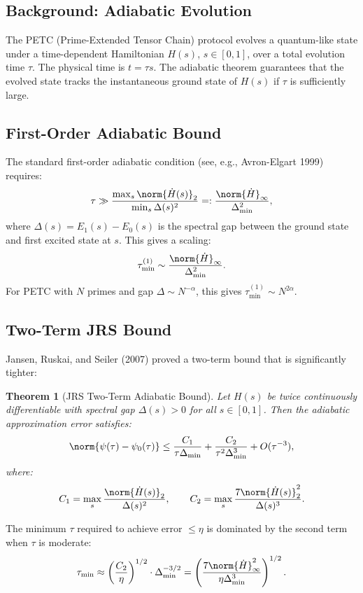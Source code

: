\documentclass[11pt,letterpaper]{article}
\newtheorem{theorem}{Theorem}[section]
\theoremstyle{remark}
\begin{document}
\subsection{Background: Adiabatic Evolution}

The PETC (Prime-Extended Tensor Chain) protocol evolves a quantum-like
state under a time-dependent Hamiltonian $H(s)$, $s \in [0,1]$,
over a total evolution time $\tau$. The physical time is $t = \tau s$.
The adiabatic theorem guarantees that the evolved state tracks the
instantaneous ground state of $H(s)$ if $\tau$ is sufficiently large.

\subsection{First-Order Adiabatic Bound}

The standard first-order adiabatic condition (see, e.g., Avron-Elgart 1999)
requires:
\[
  \tau \gg \frac{\max_s \norm{\dot{H}(s)}_2}{\min_s \Delta(s)^2}
  =: \frac{\norm{\dot{H}}_\infty}{\Delta_{\min}^2},
\]
where $\Delta(s) = E_1(s) - E_0(s)$ is the spectral gap between the
ground state and first excited state at $s$. This gives a scaling:
\[
  \tau_{\min}^{(1)} \sim \frac{\norm{\dot{H}}_\infty}{\Delta_{\min}^2}.
\]
For PETC with $N$ primes and gap $\Delta \sim N^{-\alpha}$, this gives
$\tau_{\min}^{(1)} \sim N^{2\alpha}$.

\subsection{Two-Term JRS Bound}

Jansen, Ruskai, and Seiler (2007) proved a two-term bound that is
significantly tighter:

\begin{theorem}[JRS Two-Term Adiabatic Bound]
\label{thm:A-jrs}
Let $H(s)$ be twice continuously differentiable with spectral gap
$\Delta(s) > 0$ for all $s \in [0,1]$. Then the adiabatic approximation
error satisfies:
\[
  \norm{\psi(\tau) - \psi_0(\tau)} \leq \frac{C_1}{\tau \Delta_{\min}}
  + \frac{C_2}{\tau^2 \Delta_{\min}^3}
  + O(\tau^{-3}),
\]
where:
\[
  C_1 = \max_s \frac{\norm{\dot{H}(s)}_2}{\Delta(s)^2}, \qquad
  C_2 = \max_s \frac{7\norm{\dot{H}(s)}_2^2}{\Delta(s)^3}.
\]
\end{theorem}

The minimum $\tau$ required to achieve error $\leq \eta$ is dominated
by the second term when $\tau$ is moderate:
\begin{equation}
  \tau_{\min} \approx \left(\frac{C_2}{\eta}\right)^{1/2} \cdot \Delta_{\min}^{-3/2}
  = \left(\frac{7\norm{\dot{H}}^2_\infty}{\eta \Delta_{\min}^3}\right)^{1/2}.
  \label{eq:A-jrs-bound}
\end{equation}
\end{document}

